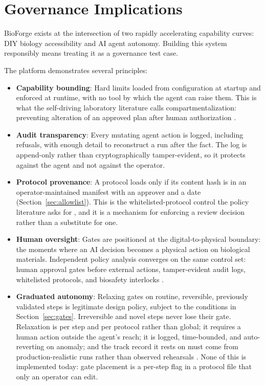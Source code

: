 \documentclass[11pt,letterpaper]{article}
\begin{document}
\section{Governance Implications}

BioForge exists at the intersection of two rapidly accelerating capability curves: DIY biology accessibility and AI agent autonomy. Building this system responsibly means treating it as a governance test case.

The platform demonstrates several principles:

\begin{itemize}
  \item \textbf{Capability bounding}: Hard limits loaded from configuration at startup and enforced at runtime, with no tool by which the agent can raise them. This is what the self-driving laboratory literature calls compartmentalization: preventing alteration of an approved plan after human authorization \cite{tobias2025}.
  \item \textbf{Audit transparency}: Every mutating agent action is logged, including refusals, with enough detail to reconstruct a run after the fact. The log is append-only rather than cryptographically tamper-evident, so it protects against the agent and not against the operator.
  \item \textbf{Protocol provenance}: A protocol loads only if its content hash is in an operator-maintained manifest with an approver and a date (Section~\ref{sec:allowlist}). This is the whitelisted-protocol control the policy literature asks for \cite{luhachack2026}, and it is a mechanism for enforcing a review decision rather than a substitute for one.
  \item \textbf{Human oversight}: Gates are positioned at the digital-to-physical boundary: the moments where an AI decision becomes a physical action on biological materials. Independent policy analysis converges on the same control set: human approval gates before external actions, tamper-evident audit logs, whitelisted protocols, and biosafety interlocks \cite{luhachack2026}.
  \item \textbf{Graduated autonomy}: Relaxing gates on routine, reversible, previously validated steps is legitimate design policy, subject to the conditions in Section~\ref{sec:gates}. Irreversible and novel steps never lose their gate. Relaxation is per step and per protocol rather than global; it requires a human action outside the agent's reach; it is logged, time-bounded, and auto-reverting on anomaly; and the track record it rests on must come from production-realistic runs rather than observed rehearsals \cite{needham2025,schoen2025,greenblatt2024}. None of this is implemented today: gate placement is a per-step flag in a protocol file that only an operator can edit.
\end{itemize}
\end{document}

